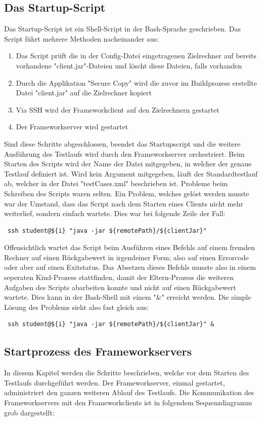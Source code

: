 \subsection{Das Startup-Script}
\label{sec:startupScript}
Das  Startup-Script ist ein Shell-Script in der Bash-Sprache geschrieben. Das Script führt mehrere Methoden nacheinander aus:
\begin{enumerate}
\item Das Script prüft die in der Config-Datei eingetragenen Zielrechner auf bereits vorhandene "client.jar"-Dateien und löscht diese Dateien, falls vorhanden
\item Durch die Applikation "Secure Copy" wird die zuvor im Buildprozess erstellte Datei "client.jar" auf die Zielrechner kopiert
\item Via SSH wird der Frameworkclient auf den Zielrechnern gestartet
\item Der Frameworkserver wird gestartet
\end{enumerate}
Sind diese Schritte abgeschlossen, beendet das Startupscript und die weitere Ausführung des Testlaufs wird durch den Frameworkserver orchestriert.
Beim Starten des Scripts wird der Name der Datei mitgegeben, in welcher der genaue Testlauf definiert ist. Wird kein Argument mitgegeben, läuft der Standardtestlauf ab, welcher in der Datei "testCases.xml" beschrieben ist.
Probleme beim Schreiben des Scripts waren selten. Ein Problem, welches gelöst werden musste war der Umstand, dass das Script nach dem Starten eines Clients nicht mehr weiterlief, sondern einfach wartete. Dies war bei folgende Zeile der Fall:
\begin{lstlisting}	
 ssh student@${i} "java -jar ${remotePath}/${clientJar}"
\end{lstlisting}	
Offensichtlich wartet das Script beim Ausführen eines Befehls auf einem fremden Rechner auf einen Rückgabewert in irgendeiner Form; also auf einen Errorcode oder aber auf einen Exitstatus. Das Absetzen dieses Befehls musste also in einem seperaten Kind-Prozess stattfinden, damit der Eltern-Prozess die weiteren Aufgaben des Scripts abarbeiten konnte und nicht auf einen Rückgabewert wartete. Dies kann in der Bash-Shell mit einem "\&" erreicht werden. Die simple Lösung des Problems sieht also fast gleich aus:
\begin{lstlisting}
 ssh student@${i} "java -jar ${remotePath}/${clientJar}" &
\end{lstlisting}

\subsection{Startprozess des Frameworkservers}
\label{sec:startFramework}
In diesem Kapitel werden die Schritte beschrieben, welche vor dem Starten des Testlaufs durchgeführt werden. Der Frameworkserver, einmal gestartet, administriert den ganzen weiteren Ablauf des Testlaufs. \newline
Die Kommunikation des Frameworkservers mit den Frameworkclients ist in folgendem Sequenzdiagramm grob dargestellt:

